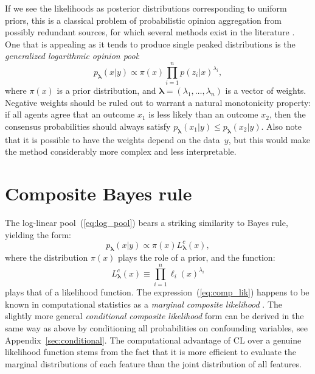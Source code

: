 \documentclass[english]{scrartcl}
\newcommand{\lda}{{\boldsymbol{\lambda}}}
\begin{document}
If we see the likelihoods as posterior distributions corresponding to uniform priors, this is a classical problem of probabilistic opinion aggregation from possibly redundant sources, for which several methods exist in the literature \cite{Tarantola-82,Genest-86,Garg-04,Allard-12}. One that is appealing as it tends to produce single peaked distributions is the {\em generalized logarithmic opinion pool}:
\begin{equation}
\label{eq:log_pool}
p_\lda(x|y) \propto \pi(x) \prod_{i=1}^n p(z_i|x)^{\lambda_i},
\end{equation} 
where $\pi(x)$ is a prior distribution, and $\lda=(\lambda_1,\ldots,\lambda_n)$ is a vector of weights. Negative weights should be ruled out to warrant a natural monotonicity property: if all agents agree that an outcome $x_1$ is less likely than an outcome $x_2$, then the consensus probabilities should always satisfy $p_\lda(x_1|y)\leq p_\lda(x_2|y)$. Also note that it is possible to have the weights depend on the data~$y$, but this would make the method considerably more complex and less interpretable. 







\section{Composite Bayes rule}
\label{sec:bayes_rule}

The log-linear pool~(\ref{eq:log_pool}) bears a striking similarity to Bayes rule, yielding  the form: 
$$
p_\lda(x|y)\propto \pi(x) L^c_\lda(x),
$$
where the distribution $\pi(x)$ plays the role of a prior, and the function:
\begin{equation}
\label{eq:comp_lik}
L^c_\lda(x) \equiv \prod_{i=1}^n \ell_i (x)^{\lambda_i}
\end{equation} 
plays that of a likelihood function. The expression~(\ref{eq:comp_lik}) happens to be known in computational statistics as a {\em marginal composite likelihood} \cite{Varin-11}. The slightly more general {\em conditional composite likelihood} form can be derived in the same way as above by conditioning all probabilities on confounding variables, see Appendix~\ref{sec:conditional}. The computational advantage of CL over a genuine likelihood function stems from the fact that it is more efficient to evaluate the marginal distributions of each feature than the joint distribution of all features.
\end{document}
